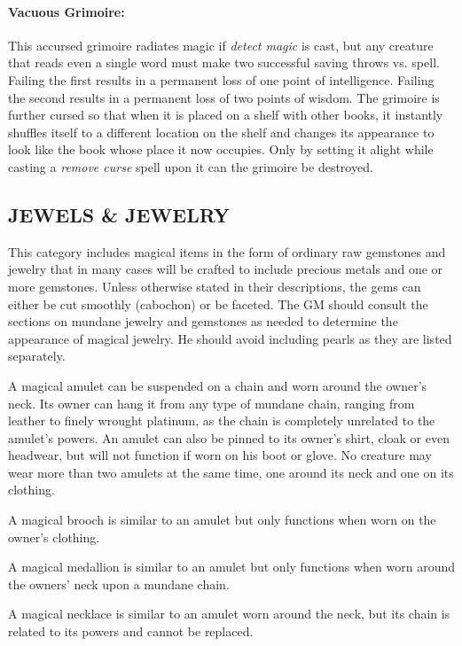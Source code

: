\begin{multicols}{2}
\paragraph{Vacuous Grimoire:} This accursed grimoire radiates magic if \textit{detect magic} is cast, but any creature that reads even a single word must make two successful saving throws vs. spell.  Failing the first results in a permanent loss of one point of intelligence.  Failing the second results in a permanent loss of two points of wisdom.  The grimoire is further cursed so that when it is placed on a shelf with other books, it instantly shuffles itself to a different location on the shelf and changes its appearance to look like the book whose place it now occupies.  Only by setting it alight while casting a \textit{remove curse} spell upon it can the grimoire be destroyed.

\subsection{JEWELS \& JEWELRY}

This category includes magical items in the form of ordinary raw gemstones and jewelry that in many cases will be crafted to include precious metals and one or more gemstones.  Unless otherwise stated in their descriptions, the gems can either be cut smoothly (cabochon) or be faceted.  The GM should consult the sections on mundane jewelry and gemstones as needed to determine the appearance of magical jewelry.  He should avoid including pearls as they are listed separately. 

A magical amulet can be suspended on a chain and worn around the owner's neck.  Its owner can hang it from any type of mundane chain, ranging from leather to finely wrought platinum, as the chain is completely unrelated to the amulet's powers.  An amulet can also be pinned to its owner's shirt, cloak or even headwear, but will not function if worn on his boot or glove.  No creature may wear more than two amulets at the same time, one around its neck and one on its clothing.

A magical brooch is similar to an amulet but only functions when worn on the owner's clothing.

A magical medallion is similar to an amulet but only functions when worn around the owners' neck upon a mundane chain.

A magical necklace is similar to an amulet worn around the neck, but its chain is related to its powers and cannot be replaced.


\end{multicols}
